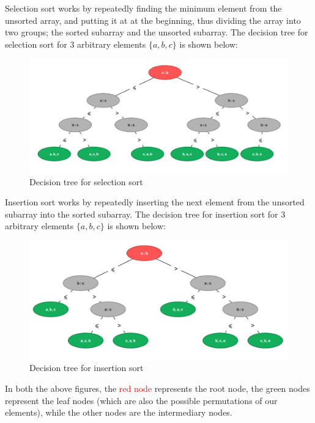 \documentclass[addpoints]{exam}
\begin{document}
\begin{questions}
  \begin{solution}
    Selection sort works by repeatedly finding the minimum element from the unsorted array, and putting it at at the beginning, thus dividing the array into two groups; the sorted subarray and the unsorted subarray. The decision tree for selection sort for 3 arbitrary elements $ \{ a, b, c \} $ is shown below:
    \begin{figure}[H]
      \centering
      \includegraphics[width=\textwidth]{selection.png}
      \caption{Decision tree for selection sort}
    \end{figure}

    Insertion sort works by repeatedly inserting the next element from the unsorted subarray into the sorted subarray. The decision tree for insertion sort for 3 arbitrary elements $ \{ a, b, c \} $ is shown below:
    \begin{figure}[H]
      \centering
      \includegraphics[width=\textwidth]{insertion.png}
      \caption{Decision tree for insertion sort}
    \end{figure}

    In both the above figures, the \textcolor{red}{red node} represents the root node, the \textcolor{deepGreen}{green nodes} represent the leaf nodes (which are also the possible permutations of our elements), while the other nodes are the intermediary nodes.


\end{solution}
\end{questions}
\end{document}
